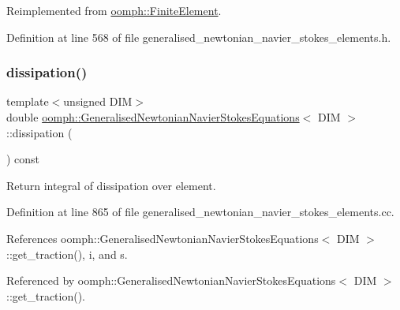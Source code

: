 Reimplemented from \hyperlink{classoomph_1_1FiniteElement_a625ea6d3f9baccfbdd1323315fb3ec71}{oomph\+::\+Finite\+Element}.



Definition at line 568 of file generalised\+\_\+newtonian\+\_\+navier\+\_\+stokes\+\_\+elements.\+h.

\mbox{\label{classoomph_1_1GeneralisedNewtonianNavierStokesEquations_a4f4ce2b0fb2e736e76a08188f3f0f7e3}} 
\subsubsection{\texorpdfstring{dissipation()}{dissipation()}\hspace{0.1cm}{\footnotesize\ttfamily [1/2]}}
{\footnotesize\ttfamily template$<$unsigned D\+IM$>$ \\
double \hyperlink{classoomph_1_1GeneralisedNewtonianNavierStokesEquations}{oomph\+::\+Generalised\+Newtonian\+Navier\+Stokes\+Equations}$<$ D\+IM $>$\+::dissipation (\begin{DoxyParamCaption}{ }\end{DoxyParamCaption}) const}



Return integral of dissipation over element. 



Definition at line 865 of file generalised\+\_\+newtonian\+\_\+navier\+\_\+stokes\+\_\+elements.\+cc.



References oomph\+::\+Generalised\+Newtonian\+Navier\+Stokes\+Equations$<$ D\+I\+M $>$\+::get\+\_\+traction(), i, and s.



Referenced by oomph\+::\+Generalised\+Newtonian\+Navier\+Stokes\+Equations$<$ D\+I\+M $>$\+::get\+\_\+traction().

\mbox{\label{classoomph_1_1GeneralisedNewtonianNavierStokesEquations_acdce90ef405748bc9d17677e1f98b85c}} 
